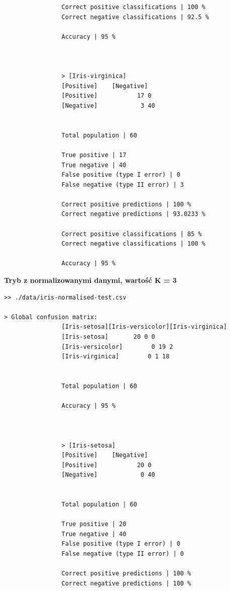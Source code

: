 \documentclass{classrep}
\begin{document}
{{{\begin{lstlisting}
                Correct positive classifications | 100 %
                Correct negative classifications | 92.5 %

                Accuracy | 95 %



                > [Iris-virginica]
                [Positive]    [Negative]
                [Positive]           17 0
                [Negative]            3 40


                Total population | 60

                True positive | 17
                True negative | 40
                False positive (type I error) | 0
                False negative (type II error) | 3

                Correct positive predictions | 100 %
                Correct negative predictions | 93.0233 %

                Correct positive classifications | 85 %
                Correct negative classifications | 100 %

                Accuracy | 95 %

                \end{lstlisting}
                \textbf{Tryb z normalizowanymi danymi, wartość K = 3}
                \begin{lstlisting}
>> ./data/iris-normalised-test.csv

> Global confusion matrix:
                [Iris-setosa][Iris-versicolor][Iris-virginica]
                [Iris-setosa]       20 0 0
                [Iris-versicolor]        0 19 2
                [Iris-virginica]        0 1 18


                Total population | 60

                Accuracy | 95 %



                > [Iris-setosa]
                [Positive]    [Negative]
                [Positive]           20 0
                [Negative]            0 40


                Total population | 60

                True positive | 20
                True negative | 40
                False positive (type I error) | 0
                False negative (type II error) | 0

                Correct positive predictions | 100 %
                Correct negative predictions | 100 %


\end{lstlisting}}}}
\end{document}
